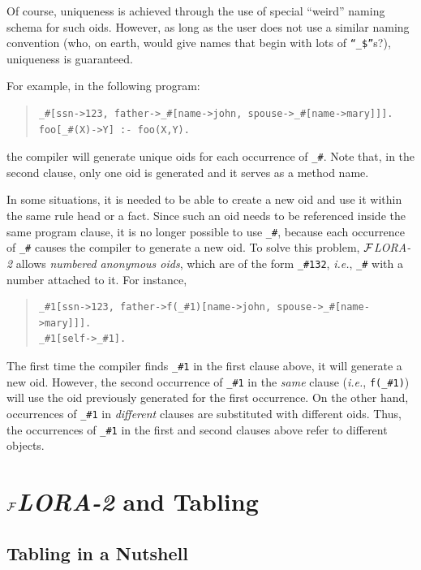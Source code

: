 \documentclass[11pt]{article}
\newcommand{\FLORA}{{\mbox{${\cal F}${\small\it LORA}\rm\emph{-2}}}\xspace}
\begin{document}
Of course, uniqueness is achieved through the use of special ``weird'' naming
schema for such oids. However, as long as the user does not use a similar
naming convention (who, on earth, would give names that begin with lots of
{\tt ``\_\$''}s?), uniqueness is guaranteed.


For example, in the following program:
\begin{quote}
\begin{verbatim}
_#[ssn->123, father->_#[name->john, spouse->_#[name->mary]]].
foo[_#(X)->Y] :- foo(X,Y).
\end{verbatim}
\end{quote}
the compiler will generate unique oids for each occurrence of {\tt \_\#}.
Note that, in the second clause, only one oid is generated and it serves as
a method name.

In some situations, it is needed to be able to create a new oid and use it
within the same rule head or a fact. Since such an oid 
needs to be referenced inside the same program clause, it is no longer
possible to use \verb|_#|, because each occurrence of \verb|_#| causes the
compiler to generate a new oid. To solve this problem, \FLORA allows 
\emph{numbered anonymous oids}, which are of the form \verb|_#132|, {\it
  i.e.}, \verb|_#| with a number attached to it. For instance, 
\begin{quote}
\begin{verbatim}
_#1[ssn->123, father->f(_#1)[name->john, spouse->_#[name->mary]]].
_#1[self->_#1].
\end{verbatim}
\end{quote}
The first time the compiler finds \verb|_#1| in the first clause above,
it will generate a new oid. However, the second occurrence of \verb|_#1|
in the \emph{same} clause ({\it i.e.}, \verb|f(_#1)|)  will use the oid
previously generated for the first occurrence. On the other hand,
occurrences of \verb|_#1| in \emph{different} clauses are substituted with
different oids. Thus, the occurrences of \verb|_#1| in the first and second
clauses above refer to different objects.



\section{\FLORA and Tabling}\label{sec-tabling-flora}


\subsection{Tabling in a Nutshell}
\end{document}
